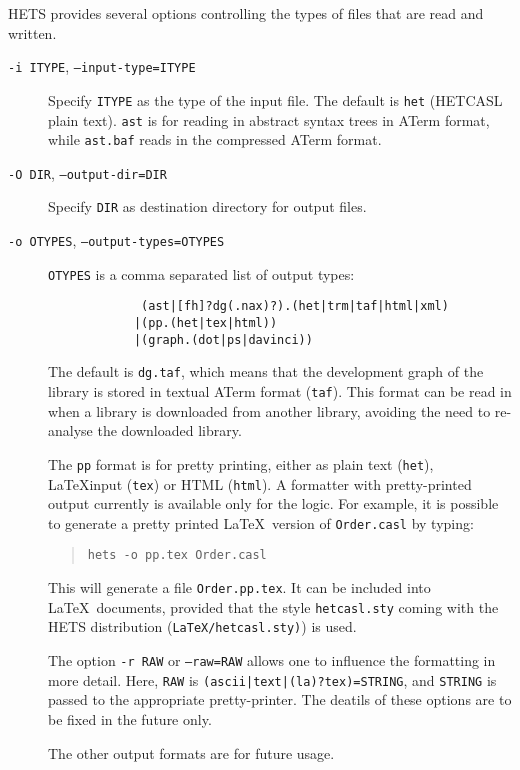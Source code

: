 \documentclass{article}
\newcommand{\normalTEXTSC}[2]{{#1\scriptsize#2}}
\newcommand     {\Hets}{\normalTEXTSC{H}{ETS}\xspace}
\newcommand{\HetCASL}{\normalTEXTSC{H}{ET}\normalTEXTSC{C}{ASL}\xspace}
\begin{document}
\Hets provides several options controlling the types of files
that are read and written.
\begin{description}
\item[\texttt{-i ITYPE}, \texttt{--input-type=ITYPE}] Specify
\texttt{ITYPE} as the type of the input file.  The default is
\texttt{het} (\HetCASL plain text). \texttt{ast} is for reading
in abstract syntax trees in ATerm format, while \texttt{ast.baf}
reads in the compressed ATerm format.

\item[\texttt{-O DIR}, \texttt{--output-dir=DIR}] 
Specify \texttt{DIR} as  destination directory for output files.

\item[\texttt{-o OTYPES}, \texttt{--output-types=OTYPES}]  
\texttt{OTYPES} is a comma separated list of output types:
\begin{verbatim}
             (ast|[fh]?dg(.nax)?).(het|trm|taf|html|xml)
            |(pp.(het|tex|html))
            |(graph.(dot|ps|davinci))
\end{verbatim}
The default is \texttt{dg.taf}, which means that the development
graph of the library is stored in textual ATerm format (\texttt{taf}).
This format can be read in when a library is downloaded from
another library, avoiding the need to re-analyse the downloaded library.

The \texttt{pp} format is for pretty printing, either as plain text
(\texttt{het}), \LaTeX input (\texttt{tex}) or HTML (\texttt{html}).
A formatter with pretty-printed output currently is available only for
the \CASL logic. For example, it is possible to generate a pretty
printed \LaTeX\ version of \texttt{Order.casl} by typing:

\begin{quote}
\texttt{hets -o pp.tex Order.casl}
\end{quote}

This will generate a file \texttt{Order.pp.tex}. It can be included
into \LaTeX\ documents, provided that the style \texttt{hetcasl.sty}
coming with the \Hets distribution (\texttt{LaTeX/hetcasl.sty)}) is used.

The option \texttt{-r RAW} or \texttt{--raw=RAW} allows one
to influence the formatting in more detail.
Here, \texttt{RAW} is \texttt{(ascii|text|(la)?tex)=STRING},
and \texttt{STRING} is passed to the appropriate pretty-printer.
The deatils of these options are to be fixed in the future only.

The other output formats are for future usage.
\end{description}
\end{document}
